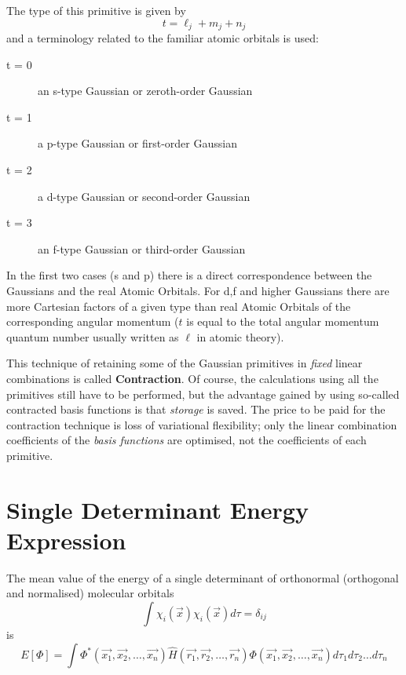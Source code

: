 The type of this primitive is given by 
\[
t = \ell_j + m_j + n_j
\]
and a terminology related to the familiar atomic orbitals is used:
\begin{description}
\item[t = 0] an s-type Gaussian or zeroth-order Gaussian
\item[t = 1] a p-type Gaussian or first-order Gaussian
\item[t = 2] a d-type Gaussian or second-order Gaussian
\item[t = 3] an f-type Gaussian or third-order Gaussian
\end{description}
In the first two cases (s and p) there is a direct correspondence
between the Gaussians and the real Atomic Orbitals. For d,f and
higher Gaussians there are more Cartesian factors of a given type than
real Atomic Orbitals of the corresponding angular momentum 
($t$ is equal to the total angular momentum quantum number usually
written as $\ell$ in atomic theory).


This technique of retaining some of the Gaussian primitives in
{\em fixed} linear combinations is called {\bf Contraction}.
Of course, the calculations using all the primitives still have to be performed,
but the advantage gained by using so-called contracted basis functions
is that {\em storage} is saved. The price to be paid for the
contraction technique is loss of variational flexibility; only
the linear combination coefficients of the {\em basis functions}
are optimised, not the coefficients of each primitive.
\section{\sf Single Determinant Energy Expression}
The mean value of the energy of a single determinant of
orthonormal (orthogonal and normalised) molecular orbitals 
\[
\int { \chi_i (\vec{x})\chi_i (\vec{x}) d \tau } = \delta_{ij}
\]
is
\begin{equation}
E[\Phi ] = \int { \Phi^* (\vec{x_1},\vec{x_2}, \ldots ,\vec{x_n} )
\hat{H}(\vec{r_1},\vec{r_2}, \ldots ,\vec{r_n} )
\Phi (\vec{x_1},\vec{x_2}, \ldots ,\vec{x_n} ) d\tau_1 d\tau_2 \ldots d\tau_n }
\end{equation}
\begin{center}
\end{center}

